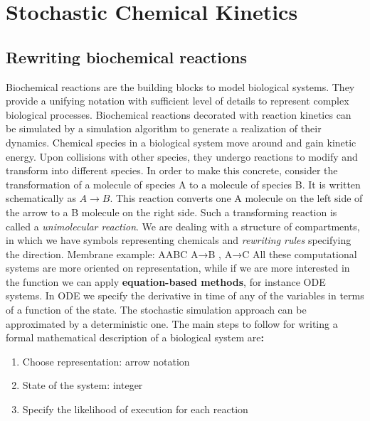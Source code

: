 \graphicspath{{chapters/02/images}}
\chapter{Stochastic Chemical Kinetics}

\section{Rewriting biochemical reactions}
Biochemical reactions are the building blocks to model biological systems.
They provide a unifying notation with sufficient level of details to represent complex biological processes.
Biochemical reactions decorated with reaction kinetics can be simulated by a simulation algorithm to generate a realization of their dynamics.
Chemical species in a biological system move around and gain kinetic energy.
Upon collisions with other species, they undergo reactions to modify and transform into different species.
In order to make this concrete, consider the transformation of a molecule of species A to a molecule of species B.
It is written schematically as $A \rightarrow B$.
This reaction converts one A molecule on the left side of the arrow to a B molecule on the right side.
Such a transforming reaction is called a \emph{unimolecular reaction}.
We are dealing with a structure of compartments, in which we have symbols representing chemicals and \emph{rewriting rules} specifying the direction.
Membrane example: AABC A→B , A→C All these computational systems are more oriented on representation, while if we are more interested in the function we can apply \textbf{equation-based methods}, for instance ODE systems.
In ODE we specify the derivative in time of any of the variables in terms of a function of the state.
The stochastic simulation approach can be approximated by a deterministic one.
The main steps to follow for writing a formal mathematical description of a biological system are\textbf{:}

\begin{enumerate}
  \def\labelenumi{\arabic{enumi}.}
  \item Choose representation: arrow notation
  \item State of the system: integer
  \item Specify the likelihood of execution for each reaction
\end{enumerate}

